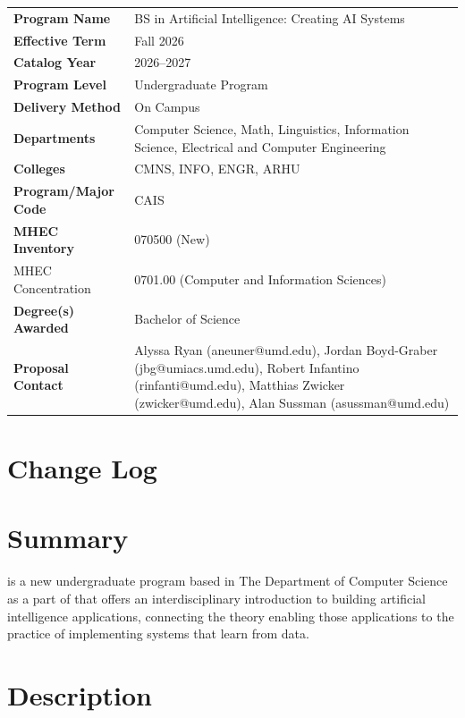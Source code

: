 \documentclass[
10pt, %
a4paper, %
oneside, %
headinclude,footinclude, %
BCOR5mm, %
]{scrartcl}
\begin{document}
\begin{tabular}{lp{8cm}}
\toprule
\textbf{Program Name} & BS in Artificial Intelligence: Creating AI Systems \\
\textbf{Effective Term} & Fall 2026 \\
\textbf{Catalog Year} & 2026--2027 \\
\textbf{Program Level} & Undergraduate Program \\
\textbf{Delivery Method} & On Campus \\
\textbf{Departments} & Computer Science, Math, Linguistics, Information Science, Electrical and Computer Engineering \\
\textbf{Colleges} & CMNS, INFO, ENGR, ARHU \\
\textbf{Program/Major Code} & CAIS \\
\textbf{MHEC Inventory} & 070500 (New) \\
{MHEC Concentration} & 0701.00 (Computer and Information Sciences) \\  %
\textbf{Degree(s) Awarded} & Bachelor of Science \\
\textbf{Proposal Contact} & Alyssa Ryan (aneuner@umd.edu), Jordan Boyd-Graber (jbg@umiacs.umd.edu), Robert Infantino (rinfanti@umd.edu), Matthias Zwicker (zwicker@umd.edu), Alan Sussman (asussman@umd.edu)  \\
\bottomrule
\end{tabular}

\section{Change Log}




\section{Summary}

\name{} is a new undergraduate program based in The Department of Computer Science as a part of \aim{} that offers an interdisciplinary introduction to building artificial intelligence applications, connecting the theory enabling those applications to the practice of implementing systems that learn from data.


\section{Description}
\end{document}
